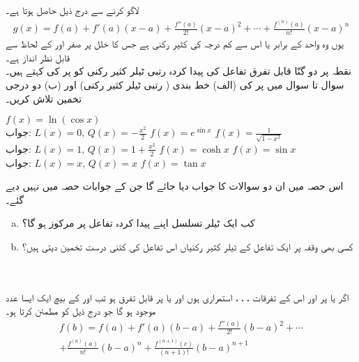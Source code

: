  لاگو کرنے سے درج ذیل حاصل ہوتا ہے۔
\begin{align*}
g(x)=f(a)+f'(a)(x-a)+\frac{f''(a)}{2!}(x-a)^2+\cdots+\frac{f^{(n)}(a)}{n!}(x-a)^n
\end{align*}
یوں  وہ واحد  کے برابر یا اس سے کم درجہ کی کثیر رکنی ہے جس کا خلل  پر صفر اور  کے لحاظ سے قابل نظر انداز ہے۔ 
\\
نقطہ  پر دو گنّا قابل تفرق تفاعل  کی پیدا کردہ  رتبی ٹیلر کثیر رکنی کو  پر  کی  کہتے ہیں۔ سوال  تا سوال  میں  پر  کی (الف) خط بندی ( رتبی ٹیلر کثیر رکنی) اور (ب) دو درجی تخمین تلاش کریں۔

$f(x)=\ln(\cos x)$\\
جواب:\quad
$L(x)=0,\, Q(x)=-\tfrac{x^2}{2}$
$f(x)=e^{\sin x}$
$f(x)=\frac{1}{\sqrt{1-x^2}}$\\
جواب:\quad
$L(x)=1,\, Q(x)=1+\tfrac{x^2}{2}$
$f(x)=\cosh x$
$f(x)=\sin x$\\
جواب:\quad
$L(x)=x,\, Q(x)=x$
$f(x)=\tan x$


اس حصہ میں ان دو سوالات کا جواب دیا جائے گا جن کے جوابات حصہ  میں نہیں دیے گئے۔
\begin{enumerate}[a.]
\item
کب ایک ٹیلر تسلسل اپنے پیدا کردہ تفاعل پر مرکوز ہو گا؟
\item
کسی بھی وقفہ پر ایک تفاعل کے ٹیلر کثیر رکنیاں اس تفاعل کی کتنی درست تخمین دیتی ہیں؟
\end{enumerate}

\\
\\
اگر  یا  پر  اور اس کے  تفرقات ، ، ،  استمراری ہوں اور  یا  پر  قابل تفرق ہو تب  اور  کے بیچ ایک ایسا عدد  موجود ہو گا جو درج ذیل کو مطمئن کرتا ہو۔
\begin{multline*}
f(b)=f(a)+f'(a)(b-a)+\frac{f''(a)}{2!}(b-a)^2+\cdots\\
+\frac{f^{(n)}(a)}{n!}(b-a)^n+\frac{f^{(n+1)}(c)}{(n+1)!}(b-a)^{n+1}
\end{multline*}

